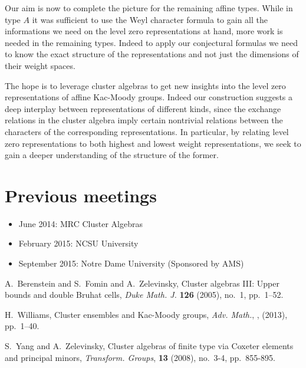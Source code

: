 \documentclass{amsart}
\begin{document}
  Our aim is now to complete the picture for the remaining affine types.
  While in type $A$ it was sufficient to use the Weyl character formula to gain all the informations we need on the level zero representations at hand, more work is needed in the remaining types.
  Indeed to apply our conjectural formulas we need to know the exact structure of the representations and not just the dimensions of their weight spaces. 
  
  The hope is to leverage cluster algebras to get new insights into the level zero representations of affine Kac-Moody groups. 
  Indeed our construction suggests a deep interplay between representations of different kinds, since the exchange relations in the cluster algebra imply certain nontrivial relations between the characters of the corresponding representations.  
  In particular, by relating level zero representations to both highest and lowest weight representations, we seek to gain a deeper understanding of the structure of the former. 
  

  \section*{Previous meetings}
  \begin{itemize}
    \item 
      June 2014: MRC Cluster Algebras
    \item
      February 2015: NCSU University
    \item
      September 2015: Notre Dame University (Sponsored by AMS)
  \end{itemize}

  \begin{thebibliography}{XXX}
    A.~Berenstein and S.~Fomin and A.~Zelevinsky, Cluster algebras III: Upper bounds and double Bruhat cells, \textsl{Duke Math. J.} \textbf{126} (2005), no.~1, pp.~1--52.

    H.~Williams, Cluster ensembles and Kac-Moody groups, \textsl{Adv. Math.}, , (2013), pp.~1--40.

    S.~Yang and A.~Zelevinsky, Cluster algebras of finite type via Coxeter elements and principal minors, \textsl{Transform. Groups}, \textbf{13} (2008), no.~3-4, pp.~855-895.
    
  \end{thebibliography}
\end{document}
